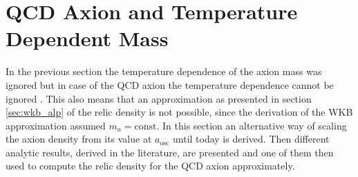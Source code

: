 \documentclass[a4paper, 12pt]{article}
\begin{document}
\section{QCD Axion and Temperature Dependent Mass}
\label{sec:temerature_dependent_mass}
In the previous section the temperature dependence of the axion mass was ignored but
in case of the QCD axion the temperature dependence cannot be ignored \cite[Sec. 4.3.2, Page 30] {MarshAxionCosmo}.
This also means that an approximation as presented in section \ref{sec:wkb_alp} of the relic density is not possible, since the derivation of
the WKB approximation assumed $m_a = \mathrm{const}$.
In this section an alternative way of scaling the axion density from its value at $a_\mathrm{osc}$ until today is derived.
Then different analytic results, derived in the literature, are presented and one of them then used to
compute the relic density for the QCD axion approximately.
\end{document}

